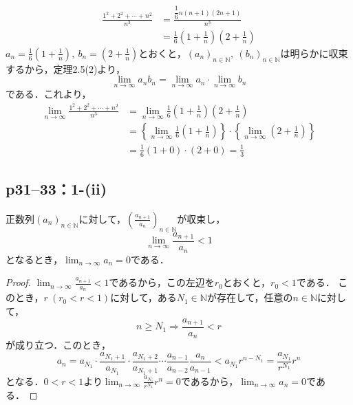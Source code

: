\documentclass[a4paper,10pt,fleqn]{ltjsarticle}
\begin{document}
\begin{tleftbar}
    \begin{align*}
        \frac{1^2+2^2+\cdots+n^2}{n^3} & = \frac{\dfrac{1}{6}n(n+1)(2n+1)}{n^3}                                \\
                                       & =\frac{1}{6} \left(1+\frac{1}{n} \right ) \left(2+\frac{1}{n} \right)
    \end{align*}
    $a_n = \frac{1}{6} \left(1+\frac{1}{n} \right ),~b_n = \left(2+\frac{1}{n} \right)$とおくと，$(a_n)_{n \in \mathbb{N}},~(b_n)_{n \in \mathbb{N}}$は明らかに収束するから，定理2.5(2)より，
    \[
        \lim_{n \to \infty} a_n b_n = \lim_{n \to \infty} a_n \cdot  \lim_{n \to \infty} b_n
    \]
    である．これより，
    \begin{align*}
        \lim_{n \to \infty} \frac{1^2+2^2+\cdots+n^2}{n^3} & = \lim_{n \to \infty} \frac{1}{6} \left(1+\frac{1}{n} \right ) \left(2+\frac{1}{n} \right)                                                                \\
                                                           & = \left \{\lim_{n \to \infty} \frac{1}{6} \left(1+\frac{1}{n} \right ) \right \} \cdot \left \{\lim_{n \to \infty} \left(2+\frac{1}{n} \right ) \right \} \\
                                                           & = \frac{1}{6} (1+0) \cdot (2+0) =\frac{1}{3}
    \end{align*}
\end{tleftbar}


\subsection*{p31--33：1-(ii)}



正数列$(a_n)_{n \in \mathbb{N}}$に対して，$\left(\frac{a_{n+1}}{a_n} \right)_{n \in \mathbb{N}}$が収束し，
\[
    \lim_{n \to \infty} \frac{a_{n+1}}{a_n} <1
\]
となるとき，$\lim_{n \to \infty} a_n =0$である．

\begin{proof}
    $ \lim_{n \to \infty} \frac{a_{n+1}}{a_n} <1$であるから，この左辺を$r_0$とおくと，$r_0<1$である．
    このとき，$r~(r_0<r<1)$に対して，ある$N_1 \in \mathbb{N}$が存在して，任意の$n \in \mathbb{N}$に対して，
    \[
        n \ge N_1 \Longrightarrow \frac{a_{n+1}}{a_n}<r
    \]
    が成り立つ．このとき，
    \[
        a_n = a_{N_1} \cdot \frac{a_{N_1+1}}{a_{N_1}} \cdot \frac{a_{N_1 +2}}{a_{N_1 +1}} \dotsm \frac{a_{n-1}}{a_{n-2}} \frac{a_n}{a_{n-1}}< a_{N_1} r^{n-N_1}=\frac{a_{N_1}}{r^{N_1}} r^n
    \]
    となる．$0<r<1$より$\lim_{n \to \infty} \frac{a_{N_1}}{r^{N_1}} r^n =0$であるから，$\lim_{n \to \infty} a_n =0$である．
\end{proof}
\end{document}
